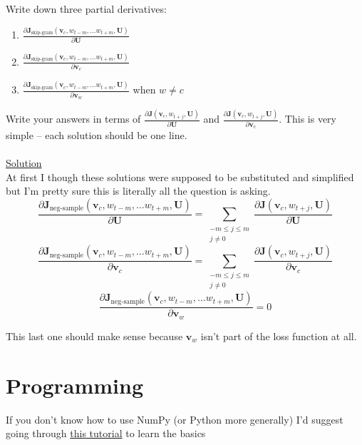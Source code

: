 \documentclass[12pt]{article}
\begin{document}
Write down three partial derivatives: 
\begin{enumerate}[label=(\roman*)]
    \item ${\frac{\partial \bm J_{\textrm{skip-gram}}(\bm v_c, w_{t-m},\ldots w_{t+m}, \bm U)} {\partial \bm U}}$
    \item ${\frac{\partial \bm J_{\textrm{skip-gram}}(\bm v_c, w_{t-m},\ldots w_{t+m}, \bm U)} {\partial \bm v_c}}$
    \item ${\frac{\partial \bm J_{\textrm{skip-gram}}(\bm v_c, w_{t-m},\ldots w_{t+m}, \bm U)} {\partial \bm v_w}}$ 
    when $w \ne c$
\end{enumerate}
Write your answers in terms of ${\frac{\partial \bm J(\bm v_c, w_{t+j}, \bm U)}{\partial \bm U}}$ 
and ${\frac{\partial \bm J(\bm v_c, w_{t+j}, \bm U)}{\partial \bm v_c}}$. This is very simple -- 
each solution should be one line.
~\\
~\\
\underline{Solution}
~\\
At first I though these solutions were supposed to be substituted and simplified but I'm pretty sure this 
is literally all the question is asking. 
\begin{equation}
    \frac{\partial \bm J_{\textrm{neg-sample}}(\bm v_c, w_{t-m},\ldots w_{t+m}, \bm U)}{\partial \bm U} = 
    \sum_{\substack{-m\le j \le m \\ j\ne 0}} 
    \frac{\partial \bm J(\bm v_c, w_{t+j}, \bm U)}{\partial \bm U}
\end{equation}
\begin{equation}
    \frac{\partial \bm J_{\textrm{neg-sample}}(\bm v_c, w_{t-m},\ldots w_{t+m}, \bm U)}{\partial \bm v_c} = 
    \sum_{\substack{-m\le j \le m \\ j\ne 0}} 
    \frac{\partial \bm J(\bm v_c, w_{t+j}, \bm U)}{\partial \bm v_c}
\end{equation}
\begin{equation}
    \frac{\partial \bm J_{\textrm{neg-sample}}(\bm v_c, w_{t-m},\ldots w_{t+m}, \bm U)}{\partial \bm v_w} = 0
\end{equation}

This last one should make sense because $\bm v_w$ isn't part of the loss function at all. 

\section{Programming}
If you don't know how to use NumPy (or Python more generally) I'd suggest going through 
\href{https://cs231n.github.io/python-numpy-tutorial/}{this tutorial} to learn the basics
\end{document}
